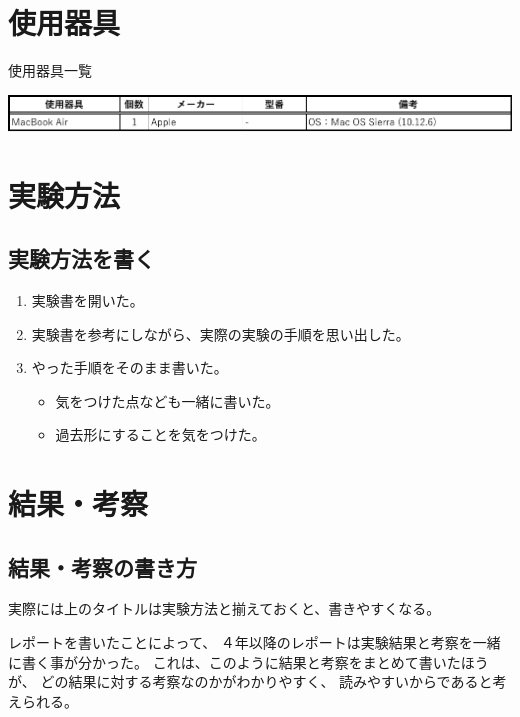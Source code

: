 \documentclass[autodetect-engine,dvipdfmx-if-dvi,ja=standard]{bxjsarticle}
\begin{document}
\section{使用器具}
\begin{table}[h]
	\vspace{-0.5\baselineskip}
    \centering
    \caption{使用器具一覧}
    \label{tb/使用器具}
	\includegraphics[width=17cm]{データ/使用器具-crop.pdf}
\end{table}



\section{実験方法}
\subsection{実験方法を書く}
\begin{enumerate}
    \item 実験書を開いた。
    \item 実験書を参考にしながら、実際の実験の手順を思い出した。
    \item やった手順をそのまま書いた。
    \begin{itemize}
        \item 気をつけた点なども一緒に書いた。
        \item 過去形にすることを気をつけた。
    \end{itemize}
\end{enumerate}



\section{結果・考察}
\subsection{結果・考察の書き方}
実際には上のタイトルは実験方法と揃えておくと、書きやすくなる。

レポートを書いたことによって、
４年以降のレポートは実験結果と考察を一緒に書く事が分かった。
これは、このように結果と考察をまとめて書いたほうが、
どの結果に対する考察なのかがわかりやすく、
読みやすいからであると考えられる。
\end{document}
